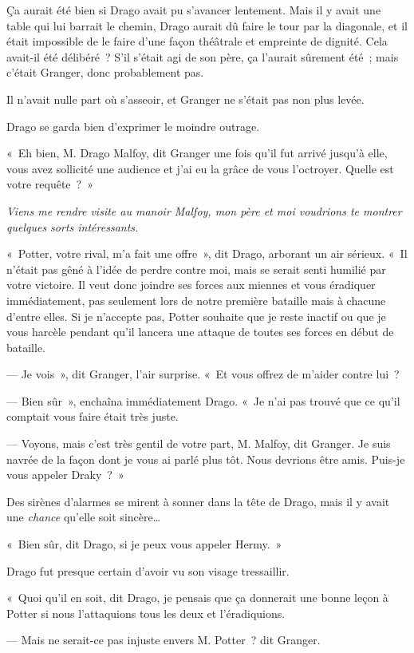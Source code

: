 Ça aurait été bien si Drago avait pu s'avancer lentement. Mais il y avait une table qui lui barrait le chemin, Drago aurait dû faire le tour par la diagonale, et il était impossible de le faire d'une façon théâtrale et empreinte de dignité. Cela avait-il été délibéré~? S'il s'était agi de son père, ça l'aurait sûrement été~; mais c'était Granger, donc probablement pas.

Il n'avait nulle part où s'asseoir, et Granger ne s'était pas non plus levée.

Drago se garda bien d'exprimer le moindre outrage.

«~Eh bien, M. Drago Malfoy, dit Granger une fois qu'il fut arrivé jusqu'à elle, vous avez sollicité une audience et j'ai eu la grâce de vous l'octroyer. Quelle est votre requête~?~»

\emph{Viens me rendre visite au manoir Malfoy, mon père et moi voudrions te montrer quelques sorts intéressants.}

«~Potter, votre rival, m'a fait une offre~», dit Drago, arborant un air sérieux. «~Il n'était pas gêné à l'idée de perdre contre moi, mais se serait senti humilié par votre victoire. Il veut donc joindre ses forces aux miennes et vous éradiquer immédiatement, pas seulement lors de notre première bataille mais à chacune d'entre elles. Si je n'accepte pas, Potter souhaite que je reste inactif ou que je vous harcèle pendant qu'il lancera une attaque de toutes ses forces en début de bataille.

--- Je vois~», dit Granger, l'air surprise. «~Et vous offrez de m'aider contre lui~?

--- Bien sûr~», enchaîna immédiatement Drago. «~Je n'ai pas trouvé que ce qu'il comptait vous faire était très juste.

--- Voyons, mais c'est très gentil de votre part, M. Malfoy, dit Granger. Je suis navrée de la façon dont je vous ai parlé plus tôt. Nous devrions être amis. Puis-je vous appeler Draky~?~»

Des sirènes d'alarmes se mirent à sonner dans la tête de Drago, mais il y avait une \emph{chance} qu'elle soit sincère…

«~Bien sûr, dit Drago, si je peux vous appeler Hermy.~»

Drago fut presque certain d'avoir vu son visage tressaillir.

«~Quoi qu'il en soit, dit Drago, je pensais que ça donnerait une bonne leçon à Potter si nous l'attaquions tous les deux et l'éradiquions.

--- Mais ne serait-ce pas injuste envers M. Potter~? dit Granger.

